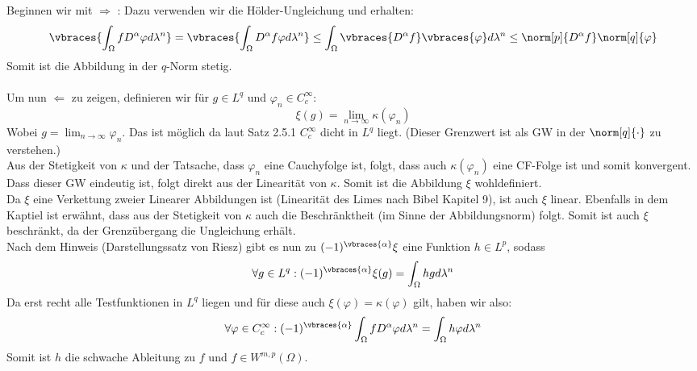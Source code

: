 \begin{solution}
Beginnen wir mit $\Rightarrow$ : Dazu verwenden wir die Hölder-Ungleichung
und erhalten:
\begin{equation*}
  \vbraces{\int_{\Omega}fD^{\alpha}\varphi d\lambda^n} =
  \vbraces{\int_{\Omega}D^{\alpha}f\varphi d\lambda^n} \leq
  \int_{\Omega}\vbraces{D^{\alpha}f}\vbraces{\varphi}d\lambda^n \leq
  \norm[p]{D^{\alpha}f}\norm[q]{\varphi}
\end{equation*}
Somit ist die Abbildung in der $q$-Norm stetig. \\ \\
Um nun $\Leftarrow$ zu zeigen, definieren wir für $g\in L^q$ und
$\varphi_n \in C^{\infty}_c$:
\begin{equation*}
  \xi(g)=\lim_{n\to\infty}\kappa(\varphi_n)
\end{equation*}
Wobei $g =\lim_{n\to\infty}\varphi_n$. Das ist möglich da laut Satz 2.5.1
$C^{\infty}_c$ dicht in $L^q$ liegt. (Dieser Grenzwert ist als GW in der
$\norm[q]{\cdot}$ zu verstehen.) \\
Aus der Stetigkeit von $\kappa$ und der Tatsache, dass $\varphi_n$ eine
Cauchyfolge ist, folgt, dass auch $\kappa(\varphi_n)$ eine CF-Folge ist und somit
konvergent. Dass dieser GW eindeutig ist, folgt direkt aus der Linearität von
$\kappa$. Somit ist die Abbildung $\xi$ wohldefiniert. \\
Da $\xi$ eine Verkettung zweier Linearer Abbildungen ist (Linearität des Limes
nach Bibel Kapitel 9), ist auch $\xi$ linear. Ebenfalls in dem Kaptiel ist
erwähnt, dass aus der Stetigkeit von $\kappa$ auch die Beschränktheit
(im Sinne der Abbildungsnorm) folgt.
Somit ist auch $\xi$ beschränkt, da der Grenzübergang die Ungleichung erhält. \\
Nach dem Hinweis (Darstellungssatz von Riesz) gibt es nun zu
$(-1)^{\vbraces{\alpha}}\xi$ eine Funktion $h \in L^p$, sodass
\begin{equation*}
  \forall g \in L^q: (-1)^{\vbraces{\alpha}}\xi(g)=\int_{\Omega}hgd\lambda^n
\end{equation*}
Da erst recht alle Testfunktionen in $L^q$ liegen und für diese auch
$\xi(\varphi) = \kappa(\varphi)$ gilt, haben wir also:
\begin{equation*}
  \forall \varphi\in C^{\infty}_c:(-1)^{\vbraces{\alpha}}\int_{\Omega}
  fD^{\alpha}\varphi d\lambda^n = \int_{\Omega}h\varphi d\lambda^n
\end{equation*}
Somit ist $h$ die schwache Ableitung zu $f$ und $f\in W^{m,p}(\Omega)$.
\end{solution}

